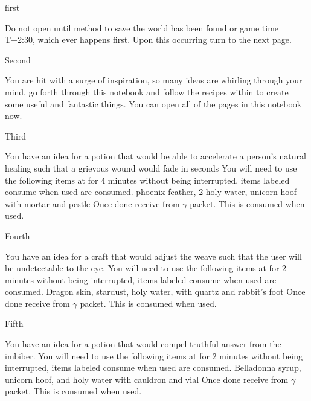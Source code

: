 \documentclass[greennotebook]{guildcamp3} %
\begin{document}
\startnotebook{\nMagTwoRecipes{}}

\begin{page}{first}
	
	Do not open until method to save the world has been found or game time T+2:30, which ever happens first. Upon this occurring turn to the next page.
	
\end{page}

\begin{page}{Second}
	
	You are hit with a surge of inspiration, so many ideas are whirling through your mind, go forth through this notebook and follow the recipes within to create some useful and fantastic things. You can open all of the pages in this notebook now.
	
\end{page}

\begin{page}{Third}
	
	You have an idea for a potion that would be able to accelerate a person's natural healing such that a grievous wound would fade in seconds
	You will need to use the following items at \sMageWorkbench{} for 4 minutes without being interrupted, items labeled consume when used are consumed.
	phoenix feather, 2 holy water, unicorn hoof with mortar and pestle
	Once done receive \iHealthRemedy{} from $\gamma$ packet. This is consumed when used. 
	
\end{page}

\begin{page}{Fourth}
	
	You have an idea for a craft that would adjust the weave such that the user will be undetectable to the eye.
	You will need to use the following items at\sMageWorkbench{} for 2 minutes without being interrupted, items labeled consume when used are consumed.
	Dragon skin, stardust, holy water, with quartz and rabbit's foot
	Once done receive \iInvisibilityCloak{} from $\gamma$ packet. This is consumed when used. 
	
\end{page}

\begin{page}{Fifth}
	
	You have an idea for a potion that would compel truthful answer from the imbiber.
	You will need to use the following items at \sMageWorkbench{} for 2 minutes without being interrupted, items labeled consume when used are consumed.
	Belladonna syrup, unicorn hoof, and holy water with cauldron and vial
	Once done receive \iTruthPotion{} from $\gamma$ packet. This is consumed when used. 
	
\end{page}
\end{document}
